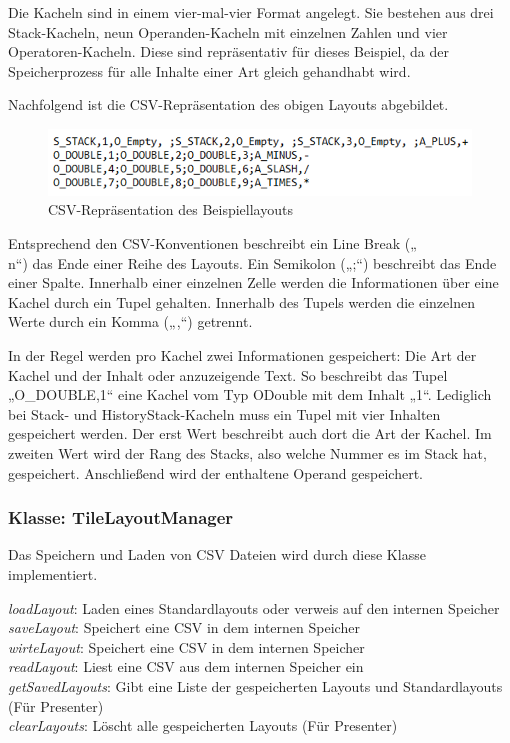Die Kacheln sind in einem vier-mal-vier Format angelegt. Sie bestehen aus drei Stack-Kacheln, neun Operanden-Kacheln mit einzelnen Zahlen und vier Operatoren-Kacheln. Diese sind repräsentativ für dieses Beispiel, da der Speicherprozess für alle Inhalte einer Art gleich gehandhabt wird.

Nachfolgend ist die CSV-Repräsentation des obigen Layouts abgebildet. 

\begin{figure}[h]
	\includegraphics[scale=1]{img/csv-repraesentation-layout}
	\caption[CSV-Repräsentation des Beispiellayouts]{CSV-Repräsentation des Beispiellayouts\footnotemark}
\end{figure}

Entsprechend den CSV-Konventionen beschreibt ein Line Break („\\n“) das Ende einer Reihe des Layouts. Ein Semikolon („;“) beschreibt das Ende einer Spalte. Innerhalb einer einzelnen Zelle werden die Informationen über eine Kachel durch ein Tupel gehalten. Innerhalb des Tupels werden die einzelnen Werte durch ein Komma („,“) getrennt.

In der Regel werden pro Kachel zwei Informationen gespeichert: Die Art der Kachel und der Inhalt oder anzuzeigende Text. So beschreibt das Tupel „O\_DOUBLE,1“ eine Kachel vom Typ ODouble mit dem Inhalt „1“. Lediglich bei Stack- und HistoryStack-Kacheln muss ein Tupel mit vier Inhalten gespeichert werden. Der erst Wert beschreibt auch dort die Art der Kachel. Im zweiten Wert wird der Rang des Stacks, also welche Nummer es im Stack hat, gespeichert. Anschließend wird der enthaltene Operand gespeichert. 

\subsubsection{Klasse: TileLayoutManager}
Das Speichern und Laden von CSV Dateien wird durch diese Klasse implementiert.

\textit{loadLayout}: Laden eines Standardlayouts oder verweis auf den internen Speicher \\
\textit{saveLayout}: Speichert eine CSV in dem internen Speicher \\
\textit{wirteLayout}: Speichert eine CSV in dem internen Speicher \\
\textit{readLayout}: Liest eine CSV aus dem internen Speicher ein \\
\textit{getSavedLayouts}: Gibt eine Liste der gespeicherten Layouts und Standardlayouts (Für Presenter) \\
\textit{clearLayouts}: Löscht alle gespeicherten Layouts (Für Presenter)

